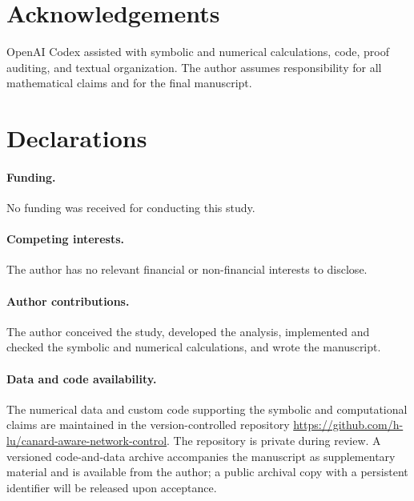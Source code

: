 \documentclass[11pt]{article}
\begin{document}
\appendix






\section*{Acknowledgements}
OpenAI Codex assisted with symbolic and numerical calculations, code,
proof auditing, and textual organization.  The author assumes responsibility
for all mathematical claims and for the final manuscript.

\section*{Declarations}
\paragraph{Funding.}
No funding was received for conducting this study.

\paragraph{Competing interests.}
The author has no relevant financial or non-financial interests to disclose.

\paragraph{Author contributions.}
The author conceived the study, developed the analysis, implemented and
checked the symbolic and numerical calculations, and wrote the manuscript.

\paragraph{Data and code availability.}
The numerical data and custom code supporting the symbolic and computational
claims are maintained in the version-controlled repository
\url{https://github.com/h-lu/canard-aware-network-control}.  The repository
is private during review.  A versioned code-and-data archive accompanies the
manuscript as supplementary material and is available from the author; a
public archival copy with a persistent identifier will be released upon
acceptance.



\end{document}
